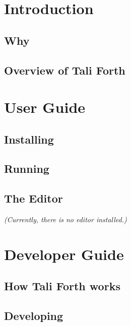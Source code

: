 \documentclass[a4paper,notitlepage]{report}
\begin{document}
\tableofcontents
\listoffigures
\listoftables

\part{Introduction}

\chapter{Why}
        

\chapter{Overview of Tali Forth}
        

\part{User Guide}

\chapter{Installing}
        

\chapter{Running}
        

\chapter{The Editor}
\textit{(Currently, there is no editor installed.)}


\part{Developer Guide}

\chapter{How Tali Forth works}
        

\chapter{Developing}
        
\end{document}
